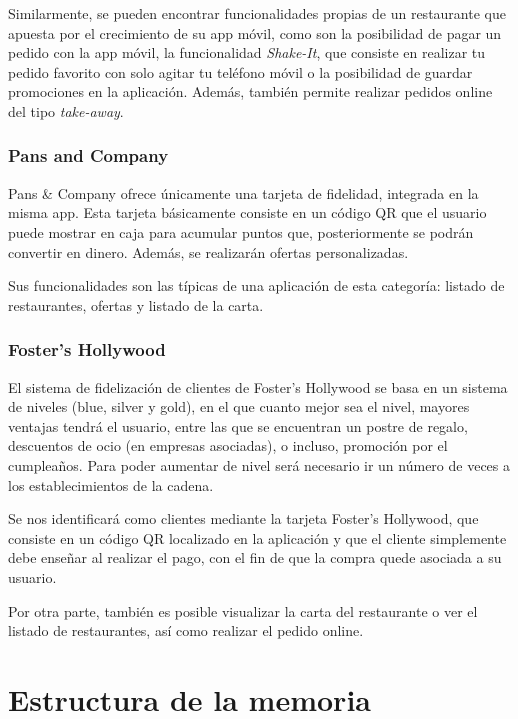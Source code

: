 \documentclass[twoside]{report}
\begin{document}
Similarmente, se pueden encontrar funcionalidades propias de un restaurante que apuesta por el crecimiento de su app móvil, como son la posibilidad de pagar un pedido con la app móvil, la funcionalidad \textit{Shake-It}, que consiste en realizar tu pedido favorito con solo agitar tu teléfono móvil o la posibilidad de guardar promociones en la aplicación. Además, también permite realizar pedidos online del tipo \textit{take-away}.

\subsubsection{Pans and Company \cite{pansapp}}

Pans \& Company ofrece únicamente una tarjeta de fidelidad, integrada en la misma app. Esta tarjeta básicamente consiste en un código QR que el usuario puede mostrar en caja para acumular puntos que, posteriormente se podrán convertir en dinero. Además, se realizarán ofertas personalizadas.

Sus funcionalidades son las típicas de una aplicación de esta categoría: listado de restaurantes, ofertas y listado de la carta.

\subsubsection{Foster's Hollywood \cite{fostersh}}

El sistema de fidelización de clientes de Foster's Hollywood se basa en un sistema de niveles (blue, silver y gold), en el que cuanto mejor sea el nivel, mayores ventajas tendrá el usuario, entre las que se encuentran un postre de regalo, descuentos de ocio (en empresas asociadas), o incluso, promoción por el cumpleaños. Para poder aumentar de nivel será necesario ir un número de veces a los establecimientos de la cadena. 

Se nos identificará como clientes mediante la tarjeta Foster's Hollywood, que consiste en un código QR localizado en la aplicación y que el cliente simplemente debe enseñar al realizar el pago, con el fin de que la compra quede asociada a su usuario.

Por otra parte, también es posible visualizar la carta del restaurante o ver el listado de restaurantes, así como realizar el pedido online.

\section{Estructura de la memoria}
\end{document}
